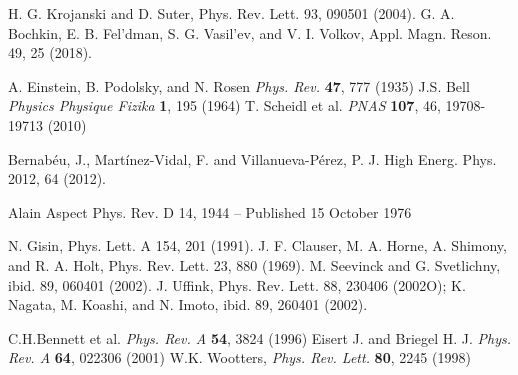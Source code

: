 \begin{thebibliography}{}
 H. G. Krojanski and D. Suter, Phys. Rev. Lett. 93, 090501 (2004).
 G. A. Bochkin, E. B. Fel’dman, S. G. Vasil’ev, and V. I. Volkov, Appl. Magn. Reson. 49, 25 (2018).


 A. Einstein, B. Podolsky, and N. Rosen \textit{Phys. Rev.} \textbf{47}, 777 (1935)
 J.S. Bell \textit{Physics Physique Fizika} \textbf{1}, 195 (1964)
 T. Scheidl et al. \textit{PNAS} \textbf{107}, 46, 19708-19713 (2010)

 Bernabéu, J., Martínez-Vidal, F. and Villanueva-Pérez, P. J. High Energ. Phys. 2012, 64 (2012).

 Alain Aspect Phys. Rev. D 14, 1944 – Published 15 October 1976

 N. Gisin, Phys. Lett. A 154, 201 (1991).
 J. F. Clauser, M. A. Horne, A. Shimony, and R. A. Holt, Phys. Rev. Lett. 23, 880 (1969).
 M. Seevinck and G. Svetlichny, ibid. 89, 060401 (2002).
  J. Uffink, Phys. Rev. Lett. 88, 230406 (2002O); K. Nagata, M. Koashi, and N. Imoto, ibid. 89, 260401 (2002).
%

 C.H.Bennett et al. \textit{Phys. Rev. A} \textbf{54}, 3824 (1996)
 Eisert J. and Briegel H. J. \textit{Phys. Rev. A} \textbf{64}, 022306 (2001)
 W.K. Wootters, \textit{Phys. Rev. Lett.} \textbf{80}, 2245 (1998)



\end{thebibliography}
